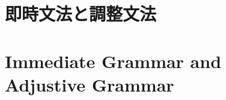 \documentclass[a4paper,xelatex,ja=standard]{bxjsarticle}
\begin{document}

\ifJPN
  \section{即時文法と調整文法}
\else
  \section{Immediate Grammar and Adjustive Grammar}
\fi
\end{document}
